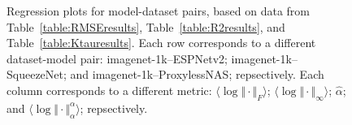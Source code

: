\begin{figure}[t]
{        \label{fig:summary_regressions_D_10}
    }
    \caption{Regression plots for model-dataset pairs, based on data from Table~\ref{table:RMSEresults}, Table~\ref{table:R2results}, and Table~\ref{table:Ktauresults}.
             Each row corresponds to a different dataset-model pair:
             imagenet-1k--ESPNetv2;
             imagenet-1k--SqueezeNet;
             and
             imagenet-1k--ProxylessNAS;
             repsectively.
             Each column corresponds to a different metric:
             $\langle\log\Vert\cdot\Vert_{F}\rangle$; 
             $\langle\log\Vert\cdot\Vert_{\infty}\rangle$; 
             $\hat{\alpha}$; 
             and
             $\langle\log\Vert\cdot\Vert^{\alpha}_{\alpha}\rangle$;
             repsectively.
            }
    \label{fig:summary_regressions_D}
\end{figure}


